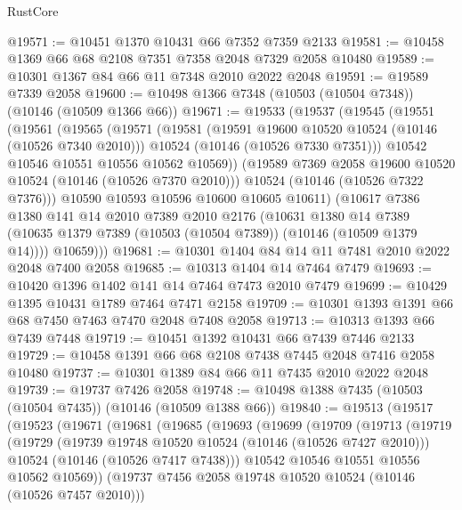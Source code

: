 \begin{lexlean}{RustCore}
\begin{coremodule}
@19571 := @10451 @1370 @10431 @66 @7352 @7359 @2133
@19581 := @10458 @1369 @66 @68 @2108 @7351 @7358 @2048 @7329 @2058 @10480
@19589 := @10301 @1367 @84 @66 @11 @7348 @2010 @2022 @2048
@19591 := @19589 @7339 @2058
@19600 := @10498 @1366 @7348 (@10503 (@10504 @7348)) (@10146 (@10509 @1366 @66))
@19671 := @19533
    (@19537
      (@19545
        (@19551
          (@19561
            (@19565
              (@19571
                (@19581
                  (@19591 @19600 @10520 @10524 (@10146 (@10526 @7340 @2010)))
                  @10524
                  (@10146 (@10526 @7330 @7351)))
                @10542
                @10546
                @10551
                @10556
                @10562
                @10569))
            (@19589 @7369 @2058 @19600 @10520 @10524 (@10146 (@10526 @7370 @2010)))
            @10524
            (@10146 (@10526 @7322 @7376)))
          @10590
          @10593
          @10596
          @10600
          @10605
          @10611)
        (@10617
          @7386
          @1380
          @141
          @14
          @2010
          @7389
          @2010
          @2176
          (@10631
            @1380
            @14
            @7389
            (@10635 @1379 @7389 (@10503 (@10504 @7389)) (@10146 (@10509 @1379 @14))))
          @10659)))
@19681 := @10301 @1404 @84 @14 @11 @7481 @2010 @2022 @2048 @7400 @2058
@19685 := @10313 @1404 @14 @7464 @7479
@19693 := @10420 @1396 @1402 @141 @14 @7464 @7473 @2010 @7479
@19699 := @10429 @1395 @10431 @1789 @7464 @7471 @2158
@19709 := @10301 @1393 @1391 @66 @68 @7450 @7463 @7470 @2048 @7408 @2058
@19713 := @10313 @1393 @66 @7439 @7448
@19719 := @10451 @1392 @10431 @66 @7439 @7446 @2133
@19729 := @10458 @1391 @66 @68 @2108 @7438 @7445 @2048 @7416 @2058 @10480
@19737 := @10301 @1389 @84 @66 @11 @7435 @2010 @2022 @2048
@19739 := @19737 @7426 @2058
@19748 := @10498 @1388 @7435 (@10503 (@10504 @7435)) (@10146 (@10509 @1388 @66))
@19840 := @19513
    (@19517
      (@19523
        (@19671
          (@19681
            (@19685
              (@19693
                (@19699
                  (@19709
                    (@19713
                      (@19719
                        (@19729
                          (@19739 @19748 @10520 @10524 (@10146 (@10526 @7427 @2010)))
                          @10524
                          (@10146 (@10526 @7417 @7438)))
                        @10542
                        @10546
                        @10551
                        @10556
                        @10562
                        @10569))
                    (@19737 @7456 @2058 @19748 @10520 @10524 (@10146 (@10526 @7457 @2010)))

\end{coremodule}
\end{lexlean}

